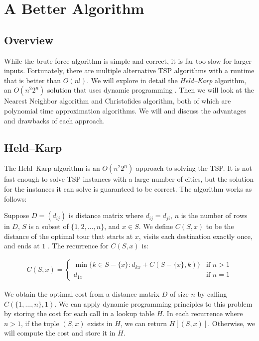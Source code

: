 \documentclass[11pt,fleqn]{article}
\begin{document}
\section{A Better Algorithm}
\subsection{Overview}
While the brute force algorithm is simple and correct, it
is far too slow for larger inputs.  Fortunately, there are multiple
alternative TSP algorithms with a runtime
that is better than $O(n!)$.  We will explore in detail the
\textit{Held--Karp} algorithm, an $O(n^2 2^n)$ solution that uses
dynamic programming \cite{heldkarp}.  Then we will look at the Nearest
Neighbor algorithm and Christofides algorithm, both of which are polynomial
time approximation algorithms.  We will and discuss the advantages
and drawbacks of each approach. 

\subsection{Held--Karp}
The Held--Karp algorithm is an $O(n^2 2^n)$ approach to solving the TSP\@.
It is not fast enough to solve TSP instances with a large number of
cities, but the solution for the instances it can solve is guaranteed
to be correct.  The algorithm works as follows:
\par

Suppose $D = (d_{ij})$ is distance
matrix where $d_{ij} = d_{ji}$, $n$ is the number of rows in $D$,
$S$ is a subset of $\{1, 2,\dots,n\}$, and $x\in S$.  We define $C(S, x)$
to be the distance of the optimal tour that starts at $x$, visits each
destination exactly once, and ends at $1$ \cite{heldkarp}.  The recurrence
for $C(S,x)$ is:

\begin{align*}
  C(S, x)=\begin{cases}
    \min\{k\in S-\{x\} : d_{kx} + C(S-\{x\}, k) \}  & \text{if } n>1 \\
    d_{1x}                                          & \text{if } n=1
  \end{cases}
\end{align*}

We obtain the optimal cost from a distance matrix $D$ of size $n$ by calling
$C(\{1,\dots,n\}, 1)$.  We can apply dynamic programming principles to this
problem by storing the cost for each call in a lookup table $H$.  In each
recurrence where $n>1$, if the tuple $(S, x)$ exists in $H$, we can return
$H[(S, x)]$.  Otherwise,  we will compute the cost and store it in $H$.
\par
\end{document}
